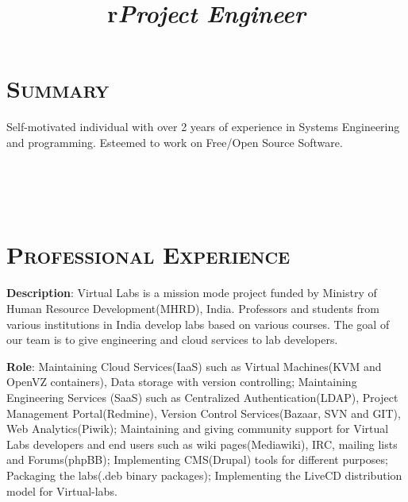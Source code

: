 \begin{resume}




\section{\textsc{Summary}}
Self-motivated individual with over 2 years of experience in Systems
Engineering and programming. Esteemed to work on Free/Open Source
Software. 
 

\begin{formatb}
  \title{r}\\
  \\
  \body\\
\end{formatb}

\section{\textsc{Professional Experience}}
\title{\em \textbf{Project Engineer}}
\begin{position}
\textbf{Description}: Virtual Labs is a mission mode project funded by
Ministry of Human Resource Development(MHRD), India. Professors and
students from various institutions in India develop labs based on
various courses. The goal of our team is to give engineering and cloud
services to lab developers.

\textbf{Role}: Maintaining Cloud Services(IaaS) such as Virtual
Machines(KVM and OpenVZ containers), Data storage with version
controlling; Maintaining Engineering Services (SaaS) such as
Centralized Authentication(LDAP), Project Management Portal(Redmine),
Version Control Services(Bazaar, SVN and GIT), Web Analytics(Piwik);
Maintaining and giving community support for Virtual Labs developers
and end users such as wiki pages(Mediawiki), IRC, mailing lists and
Forums(phpBB); Implementing CMS(Drupal) tools for different purposes;
Packaging the labs(.deb binary packages); Implementing the LiveCD
distribution model for Virtual-labs.


\end{position}
\end{resume}
